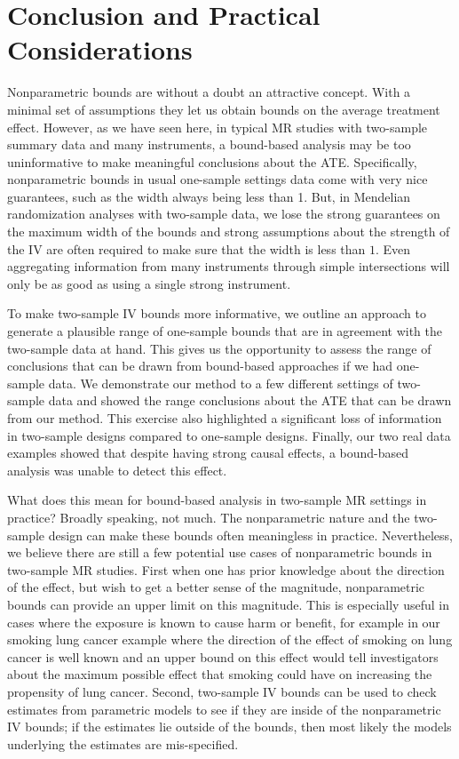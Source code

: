 \documentclass[
]{article}
\theoremstyle{plain}
\begin{document}
\hypertarget{conclusion-and-practical-considerations}{%
\section{Conclusion and Practical Considerations}\label{conclusion-and-practical-considerations}}

Nonparametric bounds are without a doubt an attractive concept. With a minimal set of assumptions they let us obtain bounds on the average treatment effect. However, as we have seen here, in typical MR studies with two-sample summary data and many instruments, a bound-based analysis may be too uninformative to make meaningful conclusions about the ATE. Specifically, nonparametric bounds in usual one-sample settings data come with very nice guarantees, such as the width always being less than 1. But, in Mendelian randomization analyses with two-sample data, we lose the strong guarantees on the maximum width of the bounds and strong assumptions about the strength of the IV are often required to make sure that the width is less than \(1\). Even aggregating information from many instruments through simple intersections will only be as good as using a single strong instrument.

To make two-sample IV bounds more informative, we outline an approach to generate a plausible range of one-sample bounds that are in agreement with the two-sample data at hand. This gives us the opportunity to assess the range of conclusions that can be drawn from bound-based approaches if we had one-sample data. We demonstrate our method to a few different settings of two-sample data and showed the range conclusions about the ATE that can be drawn from our method. This exercise also highlighted a significant loss of information in two-sample designs compared to one-sample designs. Finally, our two real data examples showed that despite having strong causal effects, a bound-based analysis was unable to detect this effect.

What does this mean for bound-based analysis in two-sample MR settings in practice? Broadly speaking, not much. The nonparametric nature and the two-sample design can make these bounds often meaningless in practice. Nevertheless, we believe there are still a few potential use cases of nonparametric bounds in two-sample MR studies. First when one has prior knowledge about the direction of the effect, but wish to get a better sense of the magnitude, nonparametric bounds can provide an upper limit on this magnitude. This is especially useful in cases where the exposure is known to cause harm or benefit, for example in our smoking lung cancer example where the direction of the effect of smoking on lung cancer is well known and an upper bound on this effect would tell investigators about the maximum possible effect that smoking could have on increasing the propensity of lung cancer. Second, two-sample IV bounds can be used to check estimates from parametric models to see if they are inside of the nonparametric IV bounds; if the estimates lie outside of the bounds, then most likely the models underlying the estimates are mis-specified.
\end{document}
